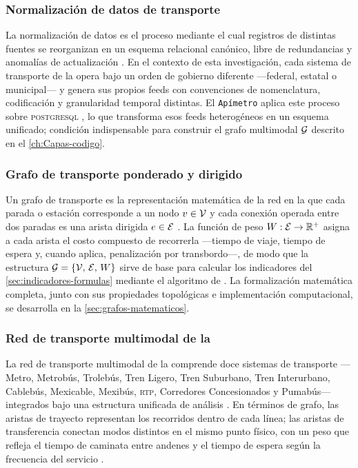 \subsubsection*{Normalización de datos de transporte}
\label{subsubsec:glosario-normalizacion}
La normalización de datos es el proceso mediante el cual registros de distintas
fuentes se reorganizan en un esquema relacional canónico, libre de redundancias
y anomalías de actualización \citep{ramakrishnan2003}. En el contexto de esta
investigación, cada sistema de transporte de la \zmvm{} opera bajo un orden de
gobierno diferente ---federal, estatal o municipal--- y genera sus propios feeds
\gtfs{} con convenciones de nomenclatura, codificación y granularidad temporal
distintas. El \texttt{Apímetro} aplica este proceso sobre \textsc{postgresql}
\citep{postgresql2024}, lo que transforma esos feeds heterogéneos en un esquema
unificado; condición indispensable para construir el grafo multimodal $\mathcal{G}$
descrito en el \autoref{ch:Capas-codigo}.

\subsubsection*{Grafo de transporte ponderado y dirigido}
\label{subsubsec:glosario-grafo}
Un grafo de transporte es la representación matemática de la red en la que cada
parada o estación corresponde a un nodo $v \in \mathcal{V}$ y cada conexión operada
entre dos paradas es una arista dirigida $e \in \mathcal{E}$
\citep{newman2010networks}. La función de peso $W: \mathcal{E} \to \mathbb{R}^+$
asigna a cada arista el costo compuesto de recorrerla ---tiempo de viaje, tiempo
de espera y, cuando aplica, penalización por transbordo---, de modo que la
estructura $\mathcal{G} = \{\mathcal{V},\, \mathcal{E},\, W\}$ sirve de base para calcular
los indicadores del \autoref{sec:indicadores-formulas} mediante el algoritmo de
\dijkstra{}. La formalización matemática completa, junto con sus propiedades
topológicas e implementación computacional, se desarrolla en la
\autoref{sec:grafos-matematicos}.

\subsubsection*{Red de transporte multimodal de la \zmvm{}}
\label{subsubsec:glosario-red-multimodal}
La red de transporte multimodal de la \zmvm{} comprende doce sistemas de
transporte ---Metro, Metrobús, Trolebús, Tren Ligero, Tren Suburbano, Tren
Interurbano, Cablebús, Mexicable, Mexibús, \textsc{rtp}, Corredores
Concesionados y Pumabús--- integrados bajo una estructura unificada de análisis
\citep{semovi2020diagnostico}. En términos de grafo, las aristas de trayecto
representan los recorridos dentro de cada línea; las aristas de transferencia
conectan modos distintos en el mismo punto físico, con un peso que refleja el
tiempo de caminata entre andenes y el tiempo de espera según la frecuencia del
servicio \citep{molinero2002}.

